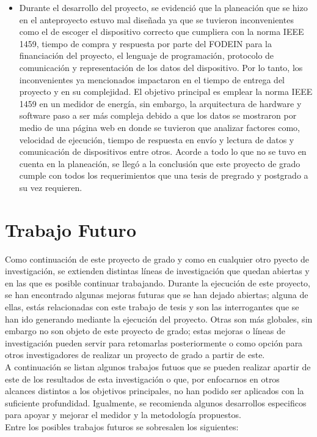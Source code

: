 \begin{itemize}
    \item Durante el desarrollo del proyecto, se evidenció que la planeación que se hizo en el anteproyecto estuvo mal diseñada ya que se tuvieron inconvenientes como el de escoger el dispositivo correcto que cumpliera con la norma IEEE 1459, tiempo de compra y respuesta por parte del FODEIN para la financiación del proyecto, el lenguaje de programación, protocolo de comunicación y representación de los datos del dispositivo. Por lo tanto, los inconvenientes ya mencionados impactaron en el tiempo de entrega del proyecto y en su complejidad. El objetivo principal es emplear la norma IEEE 1459 en un medidor de energía, sin embargo, la arquitectura de hardware y software paso a ser más compleja debido a que los datos se mostraron por medio de una página web en donde se tuvieron que analizar factores como, velocidad de ejecución, tiempo de respuesta en envío y lectura de datos y comunicación de dispositivos entre otros. Acorde a todo lo que no se tuvo en cuenta en la planeación, se llegó a la conclusión que este proyecto de grado cumple con todos los requerimientos que una tesis de pregrado y postgrado a su vez requieren.
\end{itemize}
\chapter{ Trabajo Futuro}
Como continuación de este proyecto de grado y como en cualquier otro pyecto de investigación, se extienden distintas líneas de investigación que quedan abiertas y en las que es posible continuar trabajando. Durante la ejecución de este proyecto, se han encontrado algunas mejoras futuras que se han dejado abiertas; alguna de ellas, estás relacionadas con este trabajo de tesis y son las interrogantes que se han ido generando mediante la ejecución del proyecto. Otras son más globales, sin embargo no son objeto de este proyecto de grado; estas mejoras o líneas de investigación pueden servir para retomarlas posteriormente o como opción para otros investigadores de realizar un proyecto de grado a partir de este. \\

A continuación se listan algunos trabajos futuos que se pueden realizar apartir de este de los resultados de esta investigación o que, por enfocarnos en otros alcances distintos a los objetivos principales, no han podido ser aplicados con la suficiente profundidad. Igualmente, se recomienda algunos desarrollos especificos para apoyar y mejorar el medidor y la metodología propuestos. \\
Entre los posibles trabajos futuros se sobresalen los siguientes:

